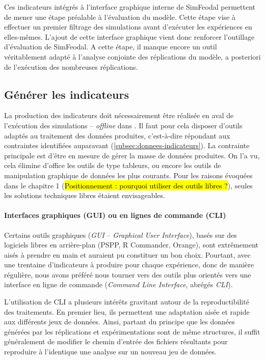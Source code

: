 Ces indicateurs intégrés à l'interface graphique interne de SimFeodal permettent de mener une étape préalable à l'évaluation du modèle.
Cette étape vise à effectuer un premier filtrage des simulations avant d'exécuter les expériences en elles-mêmes.
L'ajout de cette interface graphique vient donc renforcer l'outillage d'évaluation de SimFeodal.
A cette étape, il manque encore un outil véritablement adapté à l'analyse conjointe des réplications du modèle, a posteriori de l'exécution des nombreuses réplications.

\subsection{Générer les indicateurs}

La production des indicateurs doit nécessairement être réalisée en aval de l'exécution des simulations -- \og \textit{offline}\fg{} dans \textcite{grignard_agent-based_2017}.
Il faut pour cela disposer d'outils adaptés au traitement des données produites, c'est-à-dire répondant aux contraintes identifiées auparavant (\autoref{subsec:donnees-indicateurs}).
La contrainte principale est d'être en mesure de gérer la masse de données produites.
On l'a vu, cela élimine d'office les outils de type tableurs, ou encore les outils de manipulation graphique de données les plus courants.
Pour les raisons évoquées dans le chapitre 1 (\hl{Positionnement : pourquoi utiliser des outils libres ?}), seules les solutions techniques libres étaient envisageables.

\paragraph{Interfaces graphiques (GUI) ou en lignes de commande (CLI)}
Certains outils graphiques (\textit{GUI} -- \textit{Graphical User Interface}), basés sur des logiciels libres en arrière-plan (PSPP, R Commander, Orange), sont extrêmement aisés à prendre en main et auraient pu constituer un bon choix.
Pourtant, avec une trentaine d'indicateurs à produire pour chaque expérience, donc de manière régulière, nous avons préféré nous tourner vers des outils plus orientés vers une interface en ligne de commande (\textit{Command Line Interface}, abrégés \textit{CLI}).

L'utilisation de CLI a plusieurs intérêts gravitant autour de la reproductibilité des traitements.
En premier lieu, ils permettent une adaptation aisée et rapide aux différents jeux de données.
Ainsi, partant du principe que les données générées par les réplications et expérimentations sont de même structures, il suffit généralement de modifier le chemin d'entrée des fichiers résultants pour reproduire à l'identique une analyse sur un nouveau jeu de données.

